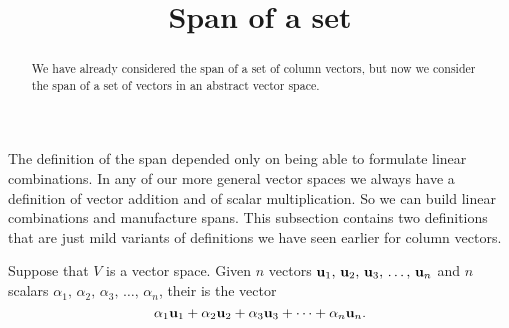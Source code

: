 \documentclass{ximera}
\title{Span of a set}
\begin{document}
\begin{abstract}
  We have already considered the span of a set of column vectors, but
  now we consider the span of a set of vectors in an abstract vector
  space.
\end{abstract}
\maketitle

The definition of the span depended only on being able to formulate
linear combinations.  In any of our more general vector spaces we
always have a definition of vector addition and of scalar
multiplication.  So we can build linear combinations and manufacture
spans.  This subsection contains two definitions that are just mild
variants of definitions we have seen earlier for column vectors.

\begin{definition}
  Suppose that $V$ is a vector space.
  Given $n$ vectors $\mathbf{u}_{1},\,\mathbf{u}_{2},\,\mathbf{u}_{3},\,\ldots,\,\mathbf{u}_{n}$ and $n$ scalars $\alpha_1,\,\alpha_2,\,\alpha_3,\,\ldots,\,\alpha_n$, their  is the vector
  \[
    \alpha_{1}\mathbf{u}_{1}+\alpha_{2}\mathbf{u}_{2}+\alpha_{3}\mathbf{u}_{3}+\cdots +\alpha_{n}\mathbf{u}_{n}.
  \]
\end{definition}
\end{document}
